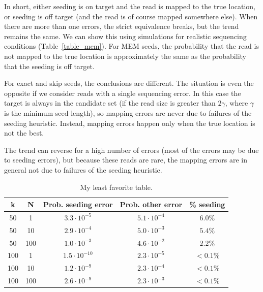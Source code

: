 \documentclass{article}
\begin{document}
In short, either seeding is on target and the read is mapped to the true
location, or seeding is off target (and the read is of course mapped
somewhere else). When there are more than one errors, the strict
equivalence breaks, but the trend remains the same. We can show this
using simulations for realistic sequencing conditions
(Table~\ref{table_mem}). For MEM seeds, the probability that the read is
not mapped to the true location is approximately the same as the
probability that the seeding is off target.

For exact and skip seeds, the conclusions are different. The situation is
even the opposite if we consider reads with a single sequencing error. In
this case the target is always in the candidate set (if the read size is
greater than $2\gamma$, where $\gamma$ is the minimum seed length), so
mapping errors are never due to failures of the seeding heuristic.
Instead, mapping errors happen only when the true location is not the
best.

The trend can reverse for a high number of errors (most of the errors may
be due to seeding errors), but because these reads are rare, the mapping
errors are in general not due to failures of the seeding heuristic.

\begin{table}
\renewcommand{\arraystretch}{1.1}
\centering
\begin{tabular}{ccccc}
k & N & Prob. seeding error & Prob. other error & \% seeding \\
\hline
50  &  1  & $3.3 \cdot 10^{-5}$  & $5.1 \cdot 10^{-4}$ & $6.0\%$ \\
50  & 10  & $2.9 \cdot 10^{-4}$  & $5.0 \cdot 10^{-3}$ & $5.4\%$ \\
50  & 100 & $1.0 \cdot 10^{-3}$  & $4.6 \cdot 10^{-2}$ & $2.2\%$ \\
100 &  1  & $1.5 \cdot 10^{-10}$ & $2.3 \cdot 10^{-5}$ & $< 0.1\%$ \\
100 & 10  & $1.2 \cdot 10^{-9}$  & $2.3 \cdot 10^{-4}$ & $< 0.1\%$ \\
100 & 100 & $2.6 \cdot 10^{-9}$  & $2.3 \cdot 10^{-3}$ & $< 0.1\%$
\end{tabular}
\caption{My least favorite table.}
\label{table_exact}
\end{table}
\end{document}
